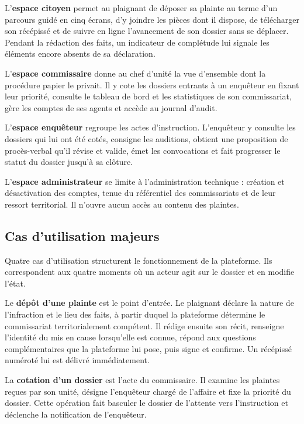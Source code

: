 L'\textbf{espace citoyen} permet au plaignant de déposer sa plainte au terme d'un parcours guidé en cinq écrans, d'y joindre les pièces dont il dispose, de télécharger son récépissé et de suivre en ligne l'avancement de son dossier sans se déplacer. Pendant la rédaction des faits, un indicateur de complétude lui signale les éléments encore absents de sa déclaration.

L'\textbf{espace commissaire} donne au chef d'unité la vue d'ensemble dont la procédure papier le privait. Il y cote les dossiers entrants à un enquêteur en fixant leur priorité, consulte le tableau de bord et les statistiques de son commissariat, gère les comptes de ses agents et accède au journal d'audit.

L'\textbf{espace enquêteur} regroupe les actes d'instruction. L'enquêteur y consulte les dossiers qui lui ont été cotés, consigne les auditions, obtient une proposition de procès-verbal qu'il révise et valide, émet les convocations et fait progresser le statut du dossier jusqu'à sa clôture.

L'\textbf{espace administrateur} se limite à l'administration technique : création et désactivation des comptes, tenue du référentiel des commissariats et de leur ressort territorial. Il n'ouvre aucun accès au contenu des plaintes.

\subsection{Cas d'utilisation majeurs}

Quatre cas d'utilisation structurent le fonctionnement de la plateforme. Ils correspondent aux quatre moments où un acteur agit sur le dossier et en modifie l'état.

Le \textbf{dépôt d'une plainte} est le point d'entrée. Le plaignant déclare la nature de l'infraction et le lieu des faits, à partir duquel la plateforme détermine le commissariat territorialement compétent. Il rédige ensuite son récit, renseigne l'identité du mis en cause lorsqu'elle est connue, répond aux questions complémentaires que la plateforme lui pose, puis signe et confirme. Un récépissé numéroté lui est délivré immédiatement.

La \textbf{cotation d'un dossier} est l'acte du commissaire. Il examine les plaintes reçues par son unité, désigne l'enquêteur chargé de l'affaire et fixe la priorité du dossier. Cette opération fait basculer le dossier de l'attente vers l'instruction et déclenche la notification de l'enquêteur.

